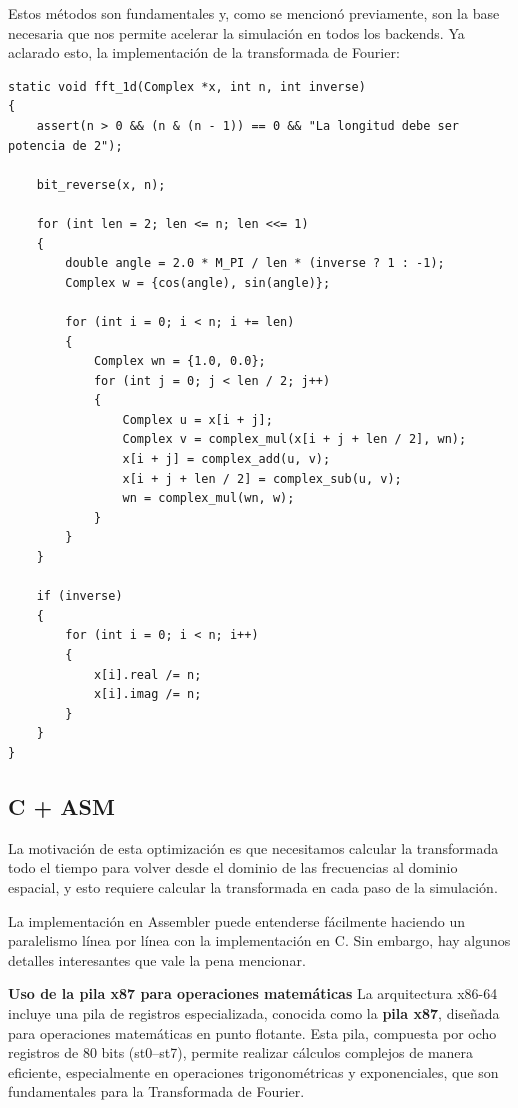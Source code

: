 \documentclass[a4paper]{article}
\begin{document}
Estos métodos son fundamentales y, como se mencionó previamente, son la base necesaria que nos permite acelerar la simulación en todos los backends. Ya aclarado esto, la implementación de la transformada de Fourier:

\begin{verbatim}
static void fft_1d(Complex *x, int n, int inverse)
{
    assert(n > 0 && (n & (n - 1)) == 0 && "La longitud debe ser potencia de 2");

    bit_reverse(x, n);

    for (int len = 2; len <= n; len <<= 1)
    {
        double angle = 2.0 * M_PI / len * (inverse ? 1 : -1);
        Complex w = {cos(angle), sin(angle)};

        for (int i = 0; i < n; i += len)
        {
            Complex wn = {1.0, 0.0};
            for (int j = 0; j < len / 2; j++)
            {
                Complex u = x[i + j];
                Complex v = complex_mul(x[i + j + len / 2], wn);
                x[i + j] = complex_add(u, v);
                x[i + j + len / 2] = complex_sub(u, v);
                wn = complex_mul(wn, w);
            }
        }
    }

    if (inverse)
    {
        for (int i = 0; i < n; i++)
        {
            x[i].real /= n;
            x[i].imag /= n;
        }
    }
}
\end{verbatim}

\subsection{C + ASM}

La motivación de esta optimización es que necesitamos calcular la transformada todo el tiempo para volver desde el dominio de las frecuencias al dominio espacial, y esto requiere calcular la transformada en cada paso de la simulación.

La implementación en Assembler puede entenderse fácilmente haciendo un paralelismo línea por línea con la implementación en C. Sin embargo, hay algunos detalles interesantes que vale la pena mencionar.

\textbf{Uso de la pila x87 para operaciones matemáticas}
La arquitectura x86-64 incluye una pila de registros especializada, conocida como la \textbf{pila x87}, diseñada para operaciones matemáticas en punto flotante.
Esta pila, compuesta por ocho registros de 80 bits (st0--st7), permite realizar cálculos complejos de manera eficiente, especialmente en operaciones trigonométricas
y exponenciales, que son fundamentales para la Transformada de Fourier.
\end{document}
